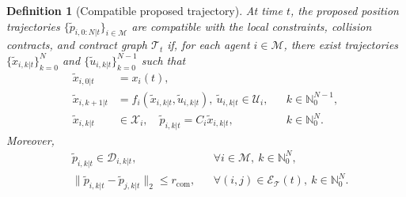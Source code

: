 \documentclass[10pt,a4paper]{amsart}
\newtheorem{definition}{Definition}
\begin{document}
\begin{definition}[Compatible proposed trajectory]
	\label{def:compatible_proposed_trajectory}
	At time $t$, the proposed position trajectories
	$\{\tilde p_{i,0:N|t}\}_{i\in\mathcal{M}}$ are compatible with the local
	constraints, collision contracts, and contract graph $\mathcal{T}_t$ if, for
	each agent $i\in\mathcal{M}$, there exist trajectories
	$\{\tilde x_{i,k|t}\}_{k=0}^{N}$ and
	$\{\tilde u_{i,k|t}\}_{k=0}^{N-1}$ such that
	\begin{align}
		\tilde x_{i,0|t}
		 & =
		x_i(t),
		\label{eq:proposed_initial_condition}
		\\
		\tilde x_{i,k+1|t}
		 & =
		f_i(\tilde x_{i,k|t},\tilde u_{i,k|t}),\
		\tilde u_{i,k|t}\in\mathcal{U}_i,
		 &     & k\in\mathbb{N}_0^{N-1},
		\label{eq:proposed_dynamics_inputs}
		\\
		\tilde x_{i,k|t}
		 & \in
		\mathcal{X}_i,\quad
		\tilde p_{i,k|t}
		=
		C_i\tilde x_{i,k|t},
		 &     & k\in\mathbb{N}_0^{N}.
		\label{eq:proposed_state_constraint_position}
	\end{align}
	Moreover,
	\begin{align}
		 & \tilde p_{i,k|t}
		\in
		\mathcal{D}_{i,k|t},
		 &                                         & \forall i\in\mathcal{M},\ k\in\mathbb{N}_0^N,
		\label{eq:proposed_inside_collision_contracts}
		\\
		 & \|\tilde p_{i,k|t}-\tilde p_{j,k|t}\|_2
		\leq
		r_{\mathrm{com}},
		 &                                         & \forall (i,j)\in\mathcal{E}_{\mathcal{T}}(t),\
		k\in\mathbb{N}_0^N.
		\label{eq:proposed_trajectory_compatible_tree}
	\end{align}
\end{definition}
\end{document}
